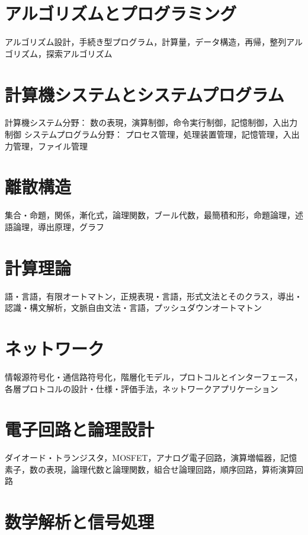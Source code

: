 \documentclass[uplatex, dvipdfmx, fleqn, a4paper, 10pt]{ujreport}
\begin{document}
\chapter{アルゴリズムとプログラミング}
アルゴリズム設計，手続き型プログラム，計算量，データ構造，再帰，整列アルゴリズム，探索アルゴリズム
\newpage
\chapter{計算機システムとシステムプログラム}
計算機システム分野：
数の表現，演算制御，命令実行制御，記憶制御，入出力制御
システムプログラム分野：
プロセス管理，処理装置管理，記憶管理，入出力管理，ファイル管理
\newpage
\chapter{離散構造}
集合・命題，関係，漸化式，論理関数，ブール代数，最簡積和形，命題論理，述語論理，導出原理，グラフ
\newpage
\chapter{計算理論}
語・言語，有限オートマトン，正規表現・言語，形式文法とそのクラス，導出・認識・構文解析，文脈自由文法・言語，プッシュダウンオートマトン
\newpage
\chapter{ネットワーク}
情報源符号化・通信路符号化，階層化モデル，プロトコルとインターフェース，各層プロトコルの設計・仕様・評価手法，ネットワークアプリケーション
\newpage
\chapter{電子回路と論理設計}
ダイオード・トランジスタ，MOSFET，アナログ電子回路，演算増幅器，記憶素子，数の表現，論理代数と論理関数，組合せ論理回路，順序回路，算術演算回路
\newpage
\chapter{数学解析と信号処理}
\end{document}
